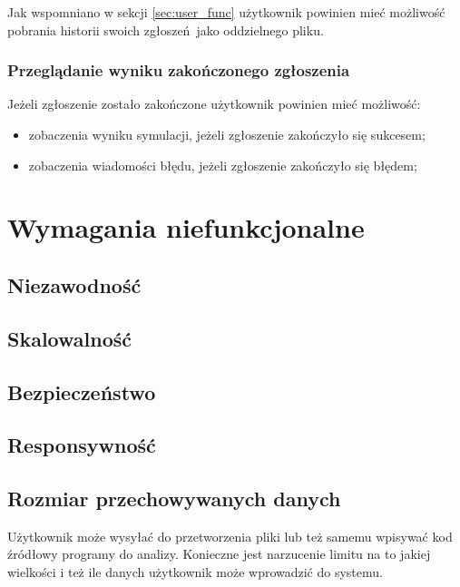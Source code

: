 Jak wspomniano w sekcji \ref{sec:user_func} użytkownik powinien mieć możliwość
pobrania historii swoich zgłoszeń jako oddzielnego pliku.

\subsubsection{Przeglądanie wyniku zakończonego zgłoszenia}

Jeżeli zgłoszenie zostało zakończone użytkownik powinien mieć możliwość:
\begin{itemize}
    \item zobaczenia wyniku symulacji, jeżeli zgłoszenie zakończyło się sukcesem;
    \item zobaczenia wiadomości błędu, jeżeli zgłoszenie zakończyło się błędem;
\end{itemize}

\section{Wymagania niefunkcjonalne}

\subsection{Niezawodność}

\subsection{Skalowalność}

\subsection{Bezpieczeństwo}

\subsection{Responsywność}

\subsection{Rozmiar przechowywanych danych}

Użytkownik może wysyłać do przetworzenia pliki lub też samemu wpisywać kod
źródłowy programy do analizy. Konieczne jest narzucenie limitu na to jakiej 
wielkości i też ile danych użytkownik może wprowadzić do systemu.

